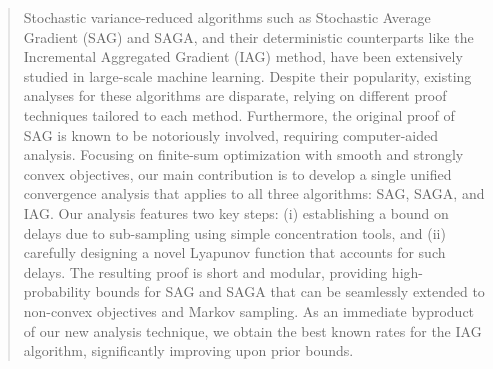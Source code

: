 \documentclass{article}
\theoremstyle{plain}
\theoremstyle{definition}
\begin{document}
\begin{abstract}

Stochastic variance-reduced algorithms such as Stochastic Average Gradient (SAG) and SAGA, and their deterministic counterparts like the Incremental Aggregated Gradient (IAG) method, have been extensively studied in large-scale machine learning. Despite their popularity, existing analyses for these algorithms are disparate, relying on different proof techniques tailored to each method. Furthermore, the original proof of SAG is known to be notoriously involved, requiring computer-aided analysis. Focusing on finite-sum optimization with smooth and strongly convex objectives, our main contribution is to develop a single unified convergence analysis that applies to all three algorithms: SAG, SAGA, and IAG. Our analysis features two key steps: (i) establishing a bound on delays due to sub-sampling using simple concentration tools, and (ii) carefully designing a novel Lyapunov function that accounts for such delays. The resulting proof is short and modular, providing high-probability bounds for SAG and SAGA that can be seamlessly extended to  non-convex objectives and Markov sampling. As an immediate byproduct of our new analysis technique, we obtain the best known rates for the IAG algorithm, significantly improving upon prior bounds.
\end{abstract}
\vspace{-8mm}
\end{document}
